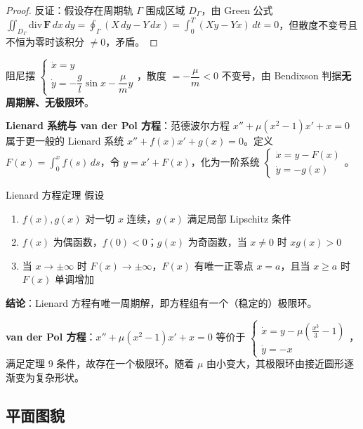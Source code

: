\begin{proof}
反证：假设存在周期轨 $\Gamma$ 围成区域 $D_\Gamma$，由 Green 公式 $\iint_{D_\Gamma}\mathrm{div}\,\mathbf{F}\,dx\,dy = \oint_\Gamma (X\,dy - Y\,dx) = \int_0^T (X\dot{y} - Y\dot{x})\,dt = 0$，但散度不变号且不恒为零时该积分 $\neq 0$，矛盾。
\end{proof}

\begin{example}
阻尼摆 $\begin{cases} \dot{x} = y \\ \dot{y} = -\dfrac{g}{l}\sin x - \dfrac{\mu}{m}y \end{cases}$，散度 $= -\dfrac{\mu}{m} < 0$ 不变号，由 Bendixson 判据\textbf{无周期解、无极限环}。
\end{example}

\textbf{Lienard 系统与 van der Pol 方程}：范德波尔方程 $x'' + \mu(x^2-1)x' + x = 0$ 属于更一般的 Lienard 系统 $x'' + f(x)x' + g(x) = 0$。定义 $F(x) = \int_0^x f(s)\,ds$，令 $y = x' + F(x)$，化为一阶系统 $\begin{cases} \dot{x} = y - F(x) \\ \dot{y} = -g(x) \end{cases}$。

\begin{myTheorem}{Lienard 方程定理}
假设
\begin{enumerate}
    \item $f(x), g(x)$ 对一切 $x$ 连续，$g(x)$ 满足局部 Lipschitz 条件
    \item $f(x)$ 为偶函数，$f(0) < 0$；$g(x)$ 为奇函数，当 $x \neq 0$ 时 $xg(x) > 0$
    \item 当 $x \to \pm\infty$ 时 $F(x) \to \pm\infty$，$F(x)$ 有唯一正零点 $x = a$，且当 $x \ge a$ 时 $F(x)$ 单调增加
\end{enumerate}
\textbf{结论}：Lienard 方程有唯一周期解，即方程组有一个（稳定的）极限环。
\end{myTheorem}

\textbf{van der Pol 方程}：$x'' + \mu(x^2-1)x' + x = 0$ 等价于 $\begin{cases} \dot{x} = y - \mu\left(\frac{x^3}{3} - 1\right) \\ \dot{y} = -x \end{cases}$，满足定理 9 条件，故存在一个极限环。随着 $\mu$ 由小变大，其极限环由接近圆形逐渐变为复杂形状。

\subsection{平面图貌}

